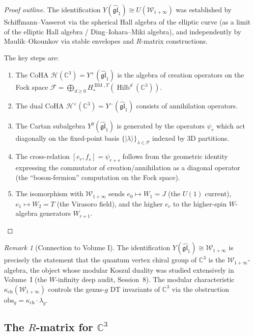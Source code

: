 \documentclass[11pt]{article}
\theoremstyle{definition}
\theoremstyle{remark}
\newtheorem{remark}[theorem]{Remark}
\newcommand{\CC}{\mathbb{C}}
\newcommand{\CoHA}{\mathcal{H}}
\newcommand{\cF}{\mathcal{F}}
\newcommand{\cW}{\mathcal{W}}
\newcommand{\BM}{\operatorname{BM}}
\newcommand{\gl}{\mathfrak{gl}}
\begin{document}
\begin{proof}[Proof outline]
The identification $Y(\widehat{\gl}_1) \cong U(\cW_{1+\infty})$ was established
by Schiffmann--Vasserot via the spherical Hall algebra of the elliptic curve
(as a limit of the elliptic Hall algebra / Ding--Iohara--Miki algebra), and
independently by Maulik--Okounkov via stable envelopes and $R$-matrix
constructions.

The key steps are:
\begin{enumerate}[label=(\arabic*)]
 \item The CoHA $\CoHA(\CC^3) = Y^+(\widehat{\gl}_1)$ is the algebra of
 creation operators on the Fock space
 $\cF = \bigoplus_{d \geq 0} H^{\BM,T}_*(\operatorname{Hilb}^d(\CC^3))$.
 \item The dual CoHA $\CoHA^{\vee}(\CC^3) = Y^-(\widehat{\gl}_1)$ consists
 of annihilation operators.
 \item The Cartan subalgebra $Y^0(\widehat{\gl}_1)$ is generated by the
 operators $\psi_r$ which act diagonally on the fixed-point basis
 $\{|\lambda\rangle\}_{\lambda \in \mathcal{P}}$ indexed by 3D partitions.
 \item The cross-relation $[e_r, f_s] = \psi_{r+s}$ follows from the
 geometric identity expressing the commutator of creation/annihilation
 as a diagonal operator (the ``boson-fermion'' computation on the Fock space).
 \item The isomorphism with $\cW_{1+\infty}$ sends $e_0 \mapsto W_1 = J$
 (the $U(1)$ current), $e_1 \mapsto W_2 = T$ (the Virasoro field),
 and the higher $e_r$ to the higher-spin $W$-algebra generators $W_{r+1}$.
\end{enumerate}
\end{proof}

\begin{remark}[Connection to Volume I]
\label{rem:vol1-connection}
The identification $Y(\widehat{\gl}_1) \cong \cW_{1+\infty}$ is precisely
the statement that the quantum vertex chiral group of $\CC^3$ is the
$\cW_{1+\infty}$-algebra, the object whose modular Koszul duality was
studied extensively in Volume~I (the $W$-infinity deep audit, Session~8).
The modular characteristic $\kappa_{\mathrm{ch}}(\cW_{1+\infty})$ controls the genus-$g$
DT invariants of $\CC^3$ via the obstruction $\mathrm{obs}_g = \kappa_{\mathrm{ch}} \cdot \lambda_g$.
\end{remark}


\subsection{The $R$-matrix for $\CC^3$}
\label{subsec:r-matrix-c3}
\end{document}
